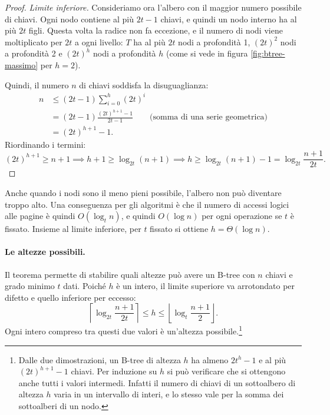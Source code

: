 \begin{proof}
    \emph{Limite inferiore.} Consideriamo ora l'albero con il maggior numero possibile di chiavi. Ogni nodo contiene al più $2t-1$ chiavi, e quindi un nodo interno ha al più $2t$ figli. Questa volta la radice non fa eccezione, e il numero di nodi viene moltiplicato per $2t$ a ogni livello: $T$ ha al più $2t$ nodi a profondità 1, $(2t)^2$ nodi a profondità 2 e $(2t)^h$ nodi a profondità $h$ (come si vede in figura \ref{fig:btree-massimo} per $h = 2$).

    Quindi, il numero $n$ di chiavi soddisfa la disuguaglianza:
    \begin{align*}
        n &\le (2t-1) \sum_{i=0}^{h} (2t)^i \\
            &= (2t-1) \frac{(2t)^{h+1} - 1}{2t - 1} \qquad\text{(somma di una serie geometrica)} \\
            &= (2t)^{h+1} - 1.
    \end{align*}
    Riordinando i termini:
    \[
    (2t)^{h+1} \ge n+1 \implies h + 1 \ge \log_{2t}(n+1) \implies h \ge \log_{2t}(n+1) - 1 = \log_{2t} \frac{n+1}{2t}.
    \]
\end{proof}

\begin{osservazione}
    Anche quando i nodi sono il meno pieni possibile, l'albero non può diventare troppo alto. Una conseguenza per gli algoritmi è che il numero di accessi logici alle pagine è quindi $O(\log_t n)$, e quindi $O(\log n)$ per ogni operazione se $t$ è fissato. Insieme al limite inferiore, per $t$ fissato si ottiene $h = \Theta(\log n)$.
\end{osservazione}

\paragraph{Le altezze possibili.}
Il teorema permette di stabilire quali altezze può avere un B-tree con $n$ chiavi e grado minimo $t$ dati. Poiché $h$ è un intero, il limite superiore va arrotondato per difetto e quello inferiore per eccesso:
\[
\left\lceil \log_{2t} \frac{n+1}{2t} \right\rceil \le h \le \left\lfloor \log_t \frac{n+1}{2} \right\rfloor.
\]
Ogni intero compreso tra questi due valori è un'altezza possibile.\footnote{Dalle due dimostrazioni, un B-tree di altezza $h$ ha almeno $2t^h - 1$ e al più $(2t)^{h+1} - 1$ chiavi. Per induzione su $h$ si può verificare che si ottengono anche tutti i valori intermedi. Infatti il numero di chiavi di un sottoalbero di altezza $h$ varia in un intervallo di interi, e lo stesso vale per la somma dei sottoalberi di un nodo.}

